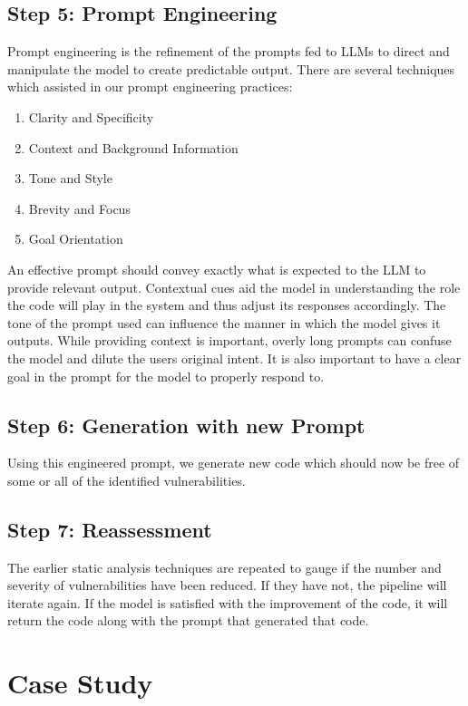 \documentclass[conference]{IEEEtran}
\begin{document}
\subsection{Step 5: Prompt Engineering}
Prompt engineering is the refinement of the prompts fed to LLMs to direct and manipulate the model to create predictable output. 
There are several techniques which assisted in our prompt engineering practices: 
\begin{enumerate}
    \item Clarity and Specificity
    \item Context and Background Information
    \item Tone and Style
    \item Brevity and Focus
    \item Goal Orientation
    \cite{promptengineeringbestpractices}
\end{enumerate} 
An effective prompt should convey exactly what is expected to the LLM to provide relevant output. Contextual cues aid the model in understanding the role the code will play in the system and thus adjust its responses accordingly. The tone of the prompt used can influence the manner in which the model gives it outputs. While providing context is important, overly long prompts can confuse the model and dilute the users original intent. It is also important to have a clear goal in the prompt for the model to properly respond to.

\subsection{Step 6: Generation with new Prompt}
Using this engineered prompt, we generate new code which should now be free of some or all of the identified vulnerabilities.

\subsection{Step 7: Reassessment}
The earlier static analysis techniques are repeated to gauge if the number and severity of vulnerabilities have been reduced. If they have not, the pipeline will iterate again. If the model is satisfied with the improvement of the code, it will return the code along with the prompt that generated that code.

\section{Case Study}
\end{document}
